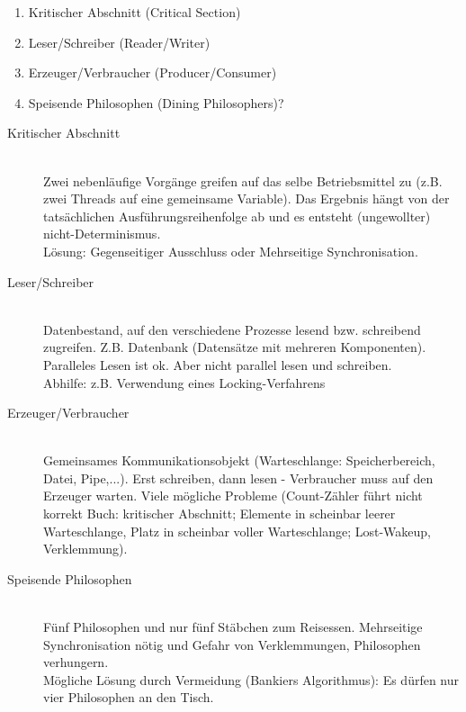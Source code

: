 \begin{multilinequestion}
\begin{enumerate}
\item Kritischer Abschnitt (Critical Section)
\item Leser/Schreiber (Reader/Writer)
\item Erzeuger/Verbraucher (Producer/Consumer)
\item Speisende Philosophen (Dining Philosophers)?
\end{enumerate}
\end{multilinequestion}
\begin{answer}
\begin{description}
\item[Kritischer Abschnitt] \hfill \\
Zwei nebenläufige Vorgänge greifen auf das selbe Betriebsmittel zu (z.B. zwei Threads auf eine gemeinsame Variable). Das Ergebnis hängt von der tatsächlichen Ausführungsreihenfolge ab und es entsteht (ungewollter) nicht-Determinismus.\\
Lösung: Gegenseitiger Ausschluss oder Mehrseitige Synchronisation.
\item[Leser/Schreiber] \hfill \\
Datenbestand, auf den verschiedene Prozesse lesend bzw. schreibend zugreifen. Z.B. Datenbank (Datensätze mit mehreren Komponenten). Paralleles Lesen ist ok. Aber nicht parallel lesen und schreiben. \\
Abhilfe: z.B. Verwendung eines Locking-Verfahrens
\item[Erzeuger/Verbraucher] \hfill \\
Gemeinsames Kommunikationsobjekt (Warteschlange: Speicherbereich, Datei, Pipe,...).
Erst schreiben, dann lesen - Verbraucher muss auf den Erzeuger warten. Viele mögliche Probleme (Count-Zähler führt nicht korrekt Buch: kritischer Abschnitt; Elemente in scheinbar leerer Warteschlange, Platz in scheinbar voller Warteschlange; Lost-Wakeup, Verklemmung).
\item[Speisende Philosophen] \hfill \\
Fünf Philosophen und nur fünf Stäbchen zum Reisessen. Mehrseitige Synchronisation nötig und Gefahr von Verklemmungen, Philosophen verhungern.\\
Mögliche Lösung durch Vermeidung (Bankiers Algorithmus): Es dürfen nur vier Philosophen an den Tisch.
\end{description}
\end{answer}

